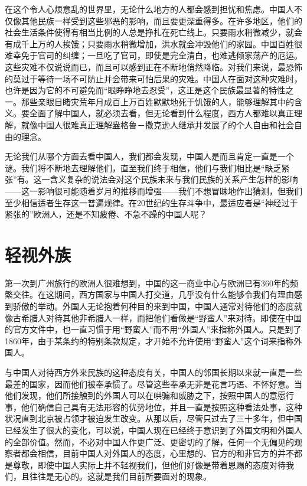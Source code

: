 \documentclass[12pt,oneside]{book}
\begin{document}
\begin{common-format}
在这个令人心烦意乱的世界里，无论什么地方的人都会感到担忧和焦虑。中国人不仅像其他民族一样受到这些邪恶的影响，而且要更深重得多。在许多地区，他们的社会生活条件使得有相当比例的人总是挣扎在死亡线上。只要雨水稍微减少，就会有成千上万的人挨饿；只要雨水稍微增加，洪水就会冲毁他们的家园。中国百姓很难幸免于官司的纠缠；一旦吃了官司，即使是完全清白，也难逃倾家荡产的厄运。这些灾难不仅说说而已，而且可以感到正在不断地俏然降临。对我们来说，最恐怖的莫过于等待一场不可防止并会带来可怕后果的灾难。中国人在面对这种灾难时，也许是因为它的不可避免而“眼睁睁地去忍受”，这正是这个民族最显著的特性之一。那些亲眼目睹灾荒年月成百上万百姓默默地死于饥饿的人，能够理解其中的含义。要全面了解中国人，就必须去看，但无论看到什么程度，西方人都难以真正理解，就像中国人很难真正理解盎格鲁－撒克逊人继承并发展了的个人自由和社会自由的理念。 

无论我们从哪个方面去看中国人，我们都会发现，中国人是而且肯定一直是一个谜。我们将不断地去理解他们，直至我们终于相信，他们与我们相比是“缺乏紧张”有。这一含义复杂的说法会对这个民族未来与我们民族的关系产生怎样的影响——这一影响很可能随着岁月的推移而增强——我们不想冒昧地作出猜测，但我们至少相信适者生存这一普遍规律。在20世纪的生存斗争中，最适应者是“神经过于紧张的”欧洲人，还是不知疲倦、不急不躁的中国人呢？ 

\chapter{轻视外族}
第一次到广州旅行的欧洲人很难想到，中国的这一商业中心与欧洲已有360年的频繁交往。在这期间，西方国家与中国人打交道，几乎没有什么能够令我们有理由感到骄傲的举动。外国人无论抱着何种目的来到中国，中国人通常对待他们的态度就像古希腊人对待其他非希腊人一样，而把他们看做是“野蛮人”来对待。即使在中国的官方文件中，也一直习惯于用“野蛮人”而不用“外国人”来指称外国人。只是到了1860年，由于某条约的特别条款规定，才开始不允许使用“野蛮人”这个词来指称外国人。 

与中国人对待西方外来民族的这种态度有关，中国人的邻国长期以来就一直是一些最差的国家，因而他们被奉承惯了。尽管这些奉承无非是花言巧语、不怀好意。当他们发现，他们所接触到的外国人可以在哄骗和威胁之下，按照中国人的意愿行事，他们确信自己具有无法形容的优势地位，并且一直是按照这种看法处事，这种状况直到北京被占领才被迫发生改变。从那以后，尽管只过去了三十多年，但中国已经发生了很大的变化，可以说，中国人现在已经终于意识到了外国文明和外国人的全部价值。然而，不必对中国人作更广泛、更密切的了解，任何一个无偏见的观察者都会相信，目前中国人对外国人的态度，心里想的、官方的和非官方的并不都是尊敬，即使中国人实际上并不轻视我们，但他们好像是带着恩赐的态度对待我们，且往往是无心的。这就是我们目前所要面对的现象。 


\end{common-format}
\end{document}

